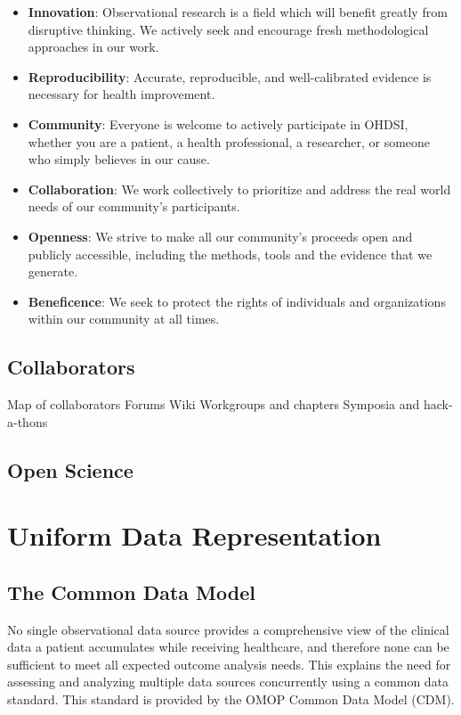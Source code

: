 \documentclass[]{book}
\begin{document}
\begin{itemize}
\item
  \textbf{Innovation}: Observational research is a field which will
  benefit greatly from disruptive thinking. We actively seek and
  encourage fresh methodological approaches in our work.
\item
  \textbf{Reproducibility}: Accurate, reproducible, and well-calibrated
  evidence is necessary for health improvement.
\item
  \textbf{Community}: Everyone is welcome to actively participate in
  OHDSI, whether you are a patient, a health professional, a researcher,
  or someone who simply believes in our cause.
\item
  \textbf{Collaboration}: We work collectively to prioritize and address
  the real world needs of our community's participants.
\item
  \textbf{Openness}: We strive to make all our community's proceeds open
  and publicly accessible, including the methods, tools and the evidence
  that we generate.
\item
  \textbf{Beneficence}: We seek to protect the rights of individuals and
  organizations within our community at all times.
\end{itemize}

\chapter{Collaborators}\label{Collaborators}

Map of collaborators Forums Wiki Workgroups and chapters Symposia and
hack-a-thons

\chapter{Open Science}\label{OpenScience}

\part{Uniform Data
Representation}\label{part-uniform-data-representation}

\chapter{The Common Data Model}\label{CommonDataModel}

No single observational data source provides a comprehensive view of the
clinical data a patient accumulates while receiving healthcare, and
therefore none can be sufficient to meet all expected outcome analysis
needs. This explains the need for assessing and analyzing multiple data
sources concurrently using a common data standard. This standard is
provided by the OMOP Common Data Model (CDM).
\end{document}
